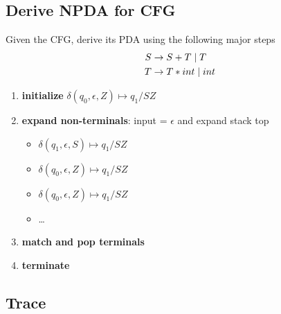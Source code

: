 \documentclass[10pt,a4paper,landscape]{article}
\begin{document}
\begin{multicols*}{3}
\subsection*{Derive NPDA for CFG}
Given the CFG, derive its PDA using the following major steps
\begin{align*}
  S &\rightarrow S + T \;|\; T\\
  T &\rightarrow T * int \;|\; int
\end{align*}
\begin{enumerate}
\item \textbf{initialize} \(\delta(q_{0},\epsilon,Z) \mapsto q_{1}/SZ\)
\item \textbf{expand non-terminals}: input = \(\epsilon\) and expand stack top
  \begin{itemize}
  \item \(\delta(q_{1},\epsilon,S) \mapsto q_{1}/SZ\)
  \item \(\delta(q_{0},\epsilon,Z) \mapsto q_{1}/SZ\)
  \item \(\delta(q_{0},\epsilon,Z) \mapsto q_{1}/SZ\)
  \item \ldots
  \end{itemize}
\item \textbf{match and pop terminals}
\item \textbf{terminate}
\end{enumerate}

\subsection*{Trace}


\end{multicols*}
\end{document}

